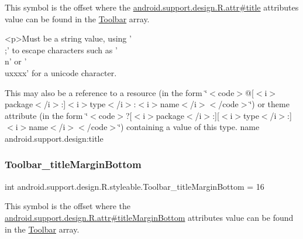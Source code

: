 This symbol is the offset where the \hyperlink{classandroid_1_1support_1_1design_1_1R_1_1attr_a1269cd6a0a69f93e03e342a0bca4f7a2}{android.\+support.\+design.\+R.\+attr\#title} attribute\textquotesingle{}s value can be found in the \hyperlink{classandroid_1_1support_1_1design_1_1R_1_1styleable_a7783ebe780dbe2a845802a40519a46e9}{Toolbar} array.

\begin{DoxyVerb}      <p>Must be a string value, using '\\;' to escape characters such as '\\n' or '\\uxxxx' for a unicode character.
\end{DoxyVerb}
 

This may also be a reference to a resource (in the form \char`\"{}$<$code$>$@\mbox{[}$<$i$>$package$<$/i$>$\+:\mbox{]}$<$i$>$type$<$/i$>$\+:$<$i$>$name$<$/i$>$$<$/code$>$\char`\"{}) or theme attribute (in the form \char`\"{}$<$code$>$?\mbox{[}$<$i$>$package$<$/i$>$\+:\mbox{]}\mbox{[}$<$i$>$type$<$/i$>$\+:\mbox{]}$<$i$>$name$<$/i$>$$<$/code$>$\char`\"{}) containing a value of this type.  name android.\+support.\+design\+:title \mbox{\label{classandroid_1_1support_1_1design_1_1R_1_1styleable_a0a632f483c823b4ce646fd30c094cb6e}} 
\subsubsection{\texorpdfstring{Toolbar\+\_\+title\+Margin\+Bottom}{Toolbar\_titleMarginBottom}}
{\footnotesize\ttfamily int android.\+support.\+design.\+R.\+styleable.\+Toolbar\+\_\+title\+Margin\+Bottom = 16\hspace{0.3cm}{\ttfamily [static]}}

This symbol is the offset where the \hyperlink{classandroid_1_1support_1_1design_1_1R_1_1attr_a2fb2f463c0477f1585632b5312aa22dc}{android.\+support.\+design.\+R.\+attr\#title\+Margin\+Bottom} attribute\textquotesingle{}s value can be found in the \hyperlink{classandroid_1_1support_1_1design_1_1R_1_1styleable_a7783ebe780dbe2a845802a40519a46e9}{Toolbar} array.

